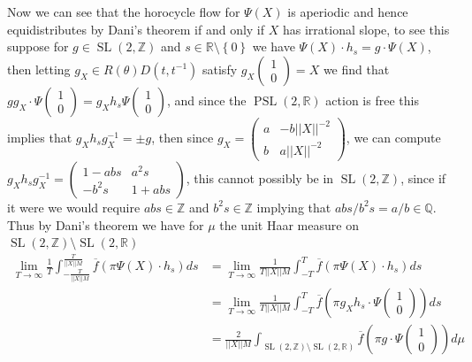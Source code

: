 \documentclass{article}
\newcommand{\set}[1]{\left\{#1\right\}}
\newcommand{\norm}[1]{\lvert\lvert#1\rvert\rvert}
\newcommand{\slr}{\operatorname{SL}(2,\mathbb{R})}
\newcommand{\slz}{\operatorname{SL}(2,\mathbb{Z})}
\begin{document}
        Now we can see that the horocycle flow for \(\Psi(X)\) is aperiodic and hence equidistributes by Dani's theorem if and only if \(X\) has irrational slope, to see this suppose for \(g \in \slz\) and \(s\in \mathbb{R} \setminus \set{0}\) we have \(\Psi(X)\cdot h_s = g\cdot \Psi(X)\), then letting \(g_X \in R(\theta)D(t,t^{-1})\) satisfy \(g_X \begin{pmatrix} 1 \\ 0 \end{pmatrix} = X\) we find that \(gg_X\cdot \Psi \begin{pmatrix} 1 \\ 0 \end{pmatrix}= g_Xh_s \Psi \begin{pmatrix} 1 \\ 0 \end{pmatrix}\), and since the \(\operatorname{PSL}(2,\mathbb{R})\) action is free this implies that \(g_Xh_sg_X^{-1} = \pm g\), then since \(g_X = \begin{pmatrix} a & -b\norm{X}^{-2} \\ b & a\norm{X}^{-2} \end{pmatrix}\), we can compute \(g_Xh_sg_X^{-1} = \begin{pmatrix} 1 - abs & a^2s \\ - b^2s & 1 + abs \end{pmatrix}\), this cannot possibly be in \(\slz\), since if it were we would require \(abs \in \mathbb{\mathbb{Z}}\) and \(b^2s \in \mathbb{Z}\) implying that \(abs/b^2s = a/b \in \mathbb{Q}\). Thus by Dani's theorem \cite{Dani} we have for \(\mu\) the unit Haar measure on \(\slz\setminus\slr\)
        \begin{align*}
            \lim_{T \to \infty} \frac{1}{T} \int_{-\frac{T}{\norm{X}M}}^{\frac{T}{\norm{X}M}}\overline{f}(\pi \Psi(X)\cdot h_s)ds 
            &= \lim_{T \to \infty} \frac{1}{T\norm{X}M} \int_{-T}^{T}\overline{f}(\pi \Psi(X)\cdot h_s)ds\\
            &= \lim_{T \to \infty} \frac{1}{T\norm{X}M} \int_{-T}^{T}\overline{f}\left(\pi g_X h_s \cdot\Psi \begin{pmatrix} 1 \\ 0 \end{pmatrix}\right)ds\\
            &= \frac{2}{\norm{X}M}\int_{\slz \setminus \slr} \overline{f}\left(\pi g \cdot \Psi \begin{pmatrix} 1 \\ 0 \end{pmatrix}\right)d\mu
        \end{align*}
\end{document}

